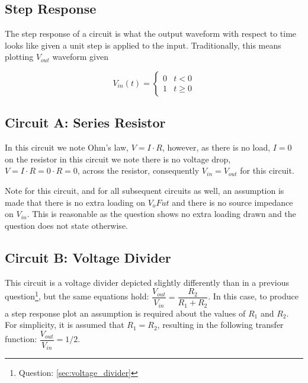 \documentclass[main.tex]{subfiles}
\begin{document}
\subsection{Step Response}
The step response of a circuit is what the output waveform with respect to time looks like given a unit step is applied to the input. Traditionally, this means plotting $V_{out}$ waveform given 

\[ V_{in}(t) = \begin{cases} 0 & t < 0 \\ 1 & t \geq 0 \end{cases} \]


\subsection{Circuit A: Series Resistor}
In this circuit we note Ohm's law, $V = I \cdot R$, however, as there is no load, $I=0$ on the resistor in this circuit we note there is no voltage drop, $V=I \cdot R=0 \cdot R=0$, across the resistor, consequently $V_{in} = V_{out}$ for this circuit. \newline

\newnoindentpara Note for this circuit, and for all subsequent circuits as well, an assumption is made that there is no extra loading on $V_oFut$ and there is no source impedance on $V_{in}$. This is reasonable as the question shows no extra loading drawn and the question does not state otherwise.

\subsection{Circuit B: Voltage Divider}
This circuit is a voltage divider depicted slightly differently than in a previous question\footnote{Question: \ref{sec:voltage_divider}}, but the same equations hold: $\dfrac{V_{out}}{V_{in}} = \dfrac{R_2}{R_1 + R_2}$. In this case, to produce a step response plot an assumption is required about the values of $R_1$ and $R_2$. For simplicity, it is assumed that $R_1 = R_2$, resulting in the following transfer function: $\dfrac{V_{out}}{V_{in}} = 1/2$.
\end{document}
